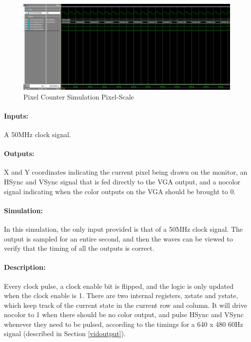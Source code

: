 \documentclass[]{article}
\begin{document}
\begin{figure}[H]\centering
    \includegraphics[width=\linewidth]{figures/XYCounter_Sim_Pixels.png}
    \caption{Pixel Counter Simulation Pixel-Scale}
    \label{fig:pixelCounterSimPixels}
\end{figure}
\paragraph{Inputs:} A 50MHz clock signal.
\paragraph{Outputs:} X and Y coordinates indicating the current pixel being drawn on the monitor, an HSync and VSync signal that is fed directly to the VGA output, and a nocolor signal indicating when the color outputs on the VGA should be brought to 0.
\paragraph{Simulation:} In this simulation, the only input provided is that of a 50MHz clock signal.  The output is sampled for an entire second, and then the waves can be viewed to verify that the timing of all the outputs is correct.
\paragraph{Description:} Every clock pulse, a clock enable bit is flipped, and the logic is only updated when the clock enable is 1.  There are two internal registers, xstate and ystate, which keep track of the current state in the current row and column.  It will drive nocolor to 1 when there should be no color output, and pulse HSync and VSync whenever they need to be pulsed, according to the timings for a 640 x 480 60Hz signal (described in Section \ref{vidoutput}).
\end{document}

